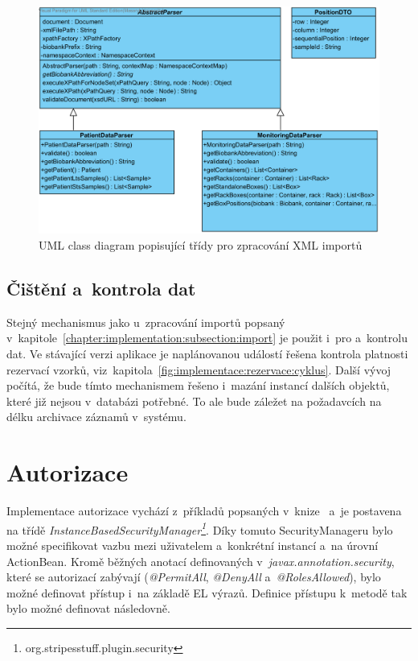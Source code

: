 \documentclass[11pt, final, oneside]{fithesis2}
\begin{document}
\begin{figure}[h!]
\begin{center}
	\includegraphics[width=\textwidth]{ParserView}
\caption{UML class diagram popisující třídy pro zpracování XML importů}
\label{fig:index:uml:class:parser}
\end{center}
\end{figure}

\subsection{Čištění a~kontrola dat}
Stejný mechanismus jako u~zpracování importů popsaný v~kapitole~\ref{chapter:implementation:subsection:import} je použit i~pro  a~kontrolu dat. Ve stávající verzi aplikace je naplánovanou událostí řešena kontrola platnosti rezervací vzorků, viz~kapitola~\ref{fig:implementace:rezervace:cyklus}. 
Další vývoj počítá, že bude tímto mechanismem řešeno i~mazání instancí dalších objektů, které již nejsou v~databázi potřebné. To ale bude záležet na požadavcích na délku archivace záznamů v~systému.

\section{Autorizace}
Implementace autorizace vychází z~příkladů popsaných v~knize~\cite{Stripes} a~je postavena na třídě \textit{InstanceBasedSecurityManager\footnote{org.stripesstuff.plugin.security}}. Díky tomuto SecurityManageru bylo možné specifikovat vazbu mezi uživatelem a~konkrétní instancí a~na úrovní ActionBean. Kromě běžných anotací definovaných v~\textit{javax.annotation.security}, které se autorizací zabývají (\textit{@PermitAll}, \textit{@DenyAll} a~\textit{@RolesAllowed}), bylo možné definovat přístup i~na základě EL výrazů. Definice přístupu k~metodě tak bylo možné definovat následovně.
\end{document}

